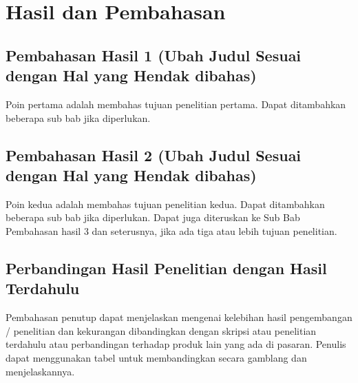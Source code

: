 \chapter{Hasil dan Pembahasan}

\section{Pembahasan Hasil 1 (Ubah Judul Sesuai dengan Hal yang Hendak dibahas)}

Poin pertama adalah membahas tujuan penelitian pertama. 
Dapat ditambahkan beberapa sub bab jika diperlukan.

\section{Pembahasan Hasil 2 (Ubah Judul Sesuai dengan Hal yang Hendak dibahas)}

Poin kedua adalah membahas tujuan penelitian kedua. Dapat ditambahkan beberapa 
sub bab jika diperlukan. Dapat juga diteruskan ke Sub Bab Pembahasan hasil 3 dan 
seterusnya, jika ada tiga atau lebih tujuan penelitian.

\section{Perbandingan Hasil Penelitian dengan Hasil Terdahulu}

Pembahasan penutup dapat menjelaskan mengenai kelebihan hasil pengembangan / 
penelitian dan kekurangan dibandingkan dengan skripsi atau penelitian terdahulu atau
perbandingan terhadap produk lain yang ada di pasaran. Penulis dapat menggunakan tabel untuk membandingkan secara gamblang dan menjelaskannya.